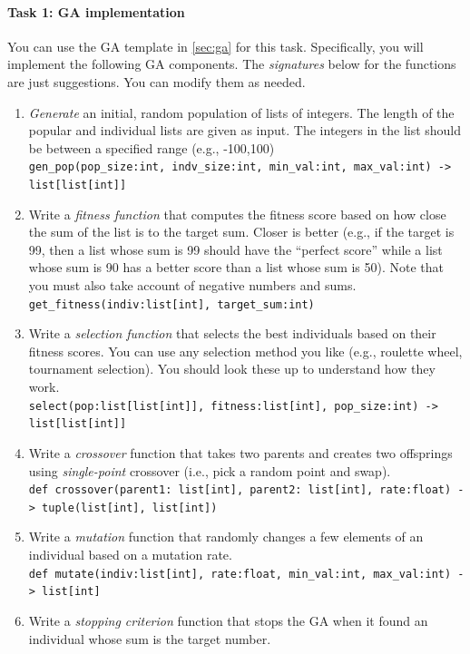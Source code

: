 \documentclass[oneside,11pt,dvipsnames]{book}
\newcommand{\code}[1]{\texttt{#1}}
\begin{document}
\paragraph{Task 1: GA implementation}

 You can use the GA template in \autoref{sec:ga} for this task. 
  Specifically, you will implement the following GA components. The \emph{signatures} below for the functions are just suggestions. You can modify them as needed.


\begin{enumerate}
    \item \emph{Generate} an initial, random population of lists of integers. The length of the popular and individual lists are given as input.  The integers in the list should be between a specified range (e.g., -100,100)\\
    \code{gen\_pop(pop\_size:int, indv\_size:int, min\_val:int, max\_val:int) -> list[list[int]]}
    \item Write a \emph{fitness function} that computes the fitness score based on how close the sum of the list is to the target sum. Closer is better (e.g., if the target is 99, then a list whose sum is 99 should have the ``perfect score'' while a list whose sum is 90 has a better score than a list whose sum is 50). Note that you must also take account of negative numbers and sums.  \\
    \code{get\_fitness(indiv:list[int], target\_sum:int)}
    \item Write a \emph{selection function} that selects the best individuals based on their fitness scores. You can use any selection method you like (e.g., roulette wheel, tournament selection). You should look these up to understand how they work.\\
    \code{select(pop:list[list[int]], fitness:list[int], pop\_size:int) -> list[list[int]]}
    \item Write a \emph{crossover} function that takes two parents and creates two offsprings using \emph{single-point} crossover (i.e., pick a random point and swap).\\
    \code{def crossover(parent1: list[int], parent2: list[int], rate:float) -> tuple(list[int], list[int])}
    \item Write a \emph{mutation} function that randomly changes a few elements of an individual based on a mutation rate.\\
    \code{def mutate(indiv:list[int], rate:float, min\_val:int, max\_val:int) -> list[int]}
    \item Write a \emph{stopping criterion} function that stops the GA when it found an individual whose sum is the target number.\\

\end{enumerate}
\end{document}
